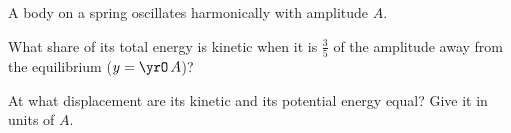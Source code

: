 A body on a spring oscillates harmonically with amplitude $A$.

\begin{abcliste}
\abc
What share of its total energy is kinetic when it is $\frac{3}{5}$ of the amplitude away from the equilibrium ($y = \yrO\,A$)?

\abc
At what displacement are its kinetic and its potential energy equal? Give it in units of $A$.
\end{abcliste}
